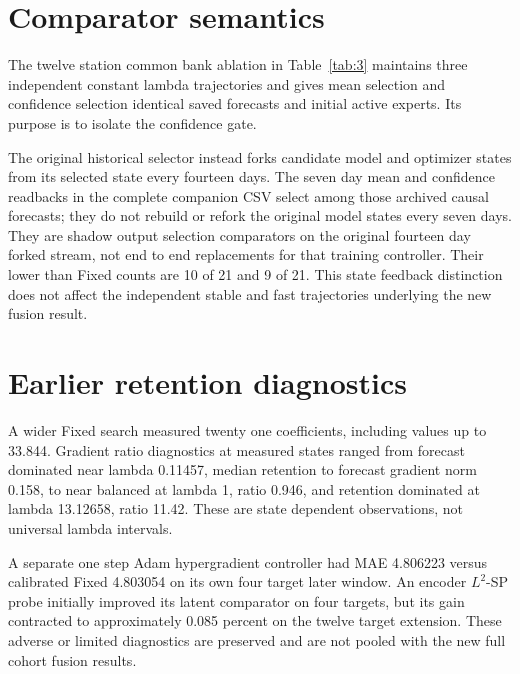 \documentclass[pdflatex,iicol,sn-mathphys-num]{sn-jnl}
\begin{document}
\appendix

\section{Comparator semantics}

The twelve station common bank ablation in Table~\ref{tab:3} maintains three independent constant lambda trajectories and gives mean selection and confidence selection identical saved forecasts and initial active experts. Its purpose is to isolate the confidence gate.

The original historical selector instead forks candidate model and optimizer states from its selected state every fourteen days. The seven day mean and confidence readbacks in the complete companion CSV select among those archived causal forecasts; they do not rebuild or refork the original model states every seven days. They are shadow output selection comparators on the original fourteen day forked stream, not end to end replacements for that training controller. Their lower than Fixed counts are 10 of 21 and 9 of 21. This state feedback distinction does not affect the independent stable and fast trajectories underlying the new fusion result.

\section{Earlier retention diagnostics}

A wider Fixed search measured twenty one coefficients, including values up to 33.844. Gradient ratio diagnostics at measured states ranged from forecast dominated near lambda 0.11457, median retention to forecast gradient norm 0.158, to near balanced at lambda 1, ratio 0.946, and retention dominated at lambda 13.12658, ratio 11.42. These are state dependent observations, not universal lambda intervals.

A separate one step Adam hypergradient controller had MAE 4.806223 versus calibrated Fixed 4.803054 on its own four target later window. An encoder $L^2$-SP probe initially improved its latent comparator on four targets, but its gain contracted to approximately 0.085 percent on the twelve target extension. These adverse or limited diagnostics are preserved and are not pooled with the new full cohort fusion results.
\FloatBarrier
\clearpage
\backmatter
\balance

\end{document}
